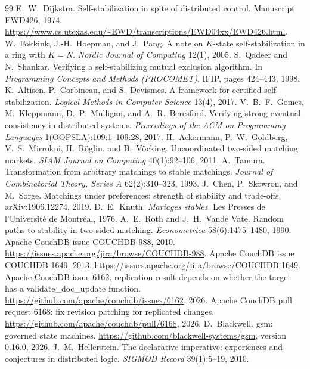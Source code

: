 \begin{thebibliography}{99}
 E.~W.~Dijkstra. Self-stabilization in spite of distributed control. Manuscript EWD426,
  1974. \url{https://www.cs.utexas.edu/~EWD/transcriptions/EWD04xx/EWD426.html}.
 W.~Fokkink, J.-H.~Hoepman, and J.~Pang. A note on $K$-state self-stabilization in
  a ring with $K = N$. \emph{Nordic Journal of Computing} 12(1), 2005.
 S.~Qadeer and N.~Shankar. Verifying a self-stabilizing mutual exclusion
  algorithm. In \emph{Programming Concepts and Methods (PROCOMET)}, IFIP, pages 424--443, 1998.
 K.~Altisen, P.~Corbineau, and S.~Devismes. A framework for certified
  self-stabilization. \emph{Logical Methods in Computer Science} 13(4), 2017.
 V.~B.~F.~Gomes, M.~Kleppmann, D.~P.~Mulligan, and A.~R.~Beresford. Verifying strong
  eventual consistency in distributed systems. \emph{Proceedings of the ACM on Programming Languages}
  1(OOPSLA):109:1--109:28, 2017.
 H.~Ackermann, P.~W.~Goldberg, V.~S.~Mirrokni, H.~R\"oglin, and B.~V\"ocking.
  Uncoordinated two-sided matching markets. \emph{SIAM Journal on Computing} 40(1):92--106, 2011.
 A.~Tamura. Transformation from arbitrary matchings to stable matchings.
  \emph{Journal of Combinatorial Theory, Series A} 62(2):310--323, 1993.
 J.~Chen, P.~Skowron, and M.~Sorge. Matchings under preferences: strength of
  stability and trade-offs. arXiv:1906.12274, 2019.
 D.~E.~Knuth. \emph{Mariages stables}. Les Presses de l'Universit\'e de Montr\'eal,
  1976.
 A.~E.~Roth and J.~H.~Vande Vate. Random paths to stability in two-sided matching.
  \emph{Econometrica} 58(6):1475--1480, 1990.
 Apache CouchDB issue COUCHDB-988, 2010.
  \url{https://issues.apache.org/jira/browse/COUCHDB-988}.
 Apache CouchDB issue COUCHDB-1649, 2013.
  \url{https://issues.apache.org/jira/browse/COUCHDB-1649}.
 Apache CouchDB issue 6162: replication result depends on whether the target has
  a validate\_doc\_update function. \url{https://github.com/apache/couchdb/issues/6162}, 2026.
 Apache CouchDB pull request 6168: fix revision patching for replicated changes.
  \url{https://github.com/apache/couchdb/pull/6168}, 2026.
 D.~Blackwell. gsm: governed state machines. \url{https://github.com/blackwell-systems/gsm},
  version 0.16.0, 2026.
 J.~M.~Hellerstein. The declarative imperative: experiences and conjectures
  in distributed logic. \emph{SIGMOD Record} 39(1):5--19, 2010.

\end{thebibliography}
